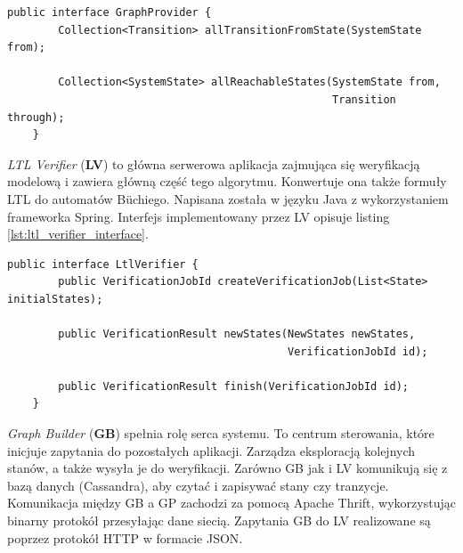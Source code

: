 \begin{lstlisting}[caption={Interfejs implementowany przez GP.},captionpos=b,label={lst:graph_provider_interface}]
    public interface GraphProvider {
        Collection<Transition> allTransitionFromState(SystemState from);

        Collection<SystemState> allReachableStates(SystemState from,
                                                   Transition through);
    }
\end{lstlisting}

\textit{LTL Verifier} (\textbf{LV}) to główna serwerowa aplikacja zajmująca się weryfikacją modelową i zawiera główną część tego algorytmu.
Konwertuje ona także formuły LTL do automatów Büchiego.
Napisana została w języku Java z wykorzystaniem frameworka Spring.
Interfejs implementowany przez LV opisuje listing \ref{lst:ltl_verifier_interface}.

\begin{lstlisting}[caption={Interfejs implementowany przez LV.},captionpos=b,label={lst:ltl_verifier_interface}]
    public interface LtlVerifier {
        public VerificationJobId createVerificationJob(List<State> initialStates);

        public VerificationResult newStates(NewStates newStates,
                                            VerificationJobId id);

        public VerificationResult finish(VerificationJobId id);
    }
\end{lstlisting}

\textit{Graph Builder} (\textbf{GB}) spełnia rolę serca systemu.
To centrum sterowania, które inicjuje zapytania do pozostałych aplikacji.
Zarządza eksploracją kolejnych stanów, a także wysyła je do weryfikacji.
Zarówno GB jak i LV komunikują się z bazą danych (Cassandra), aby czytać i zapisywać stany czy tranzycje.
Komunikacja między GB a GP zachodzi za pomocą Apache Thrift, wykorzystując binarny protokół przesyłając dane siecią.
Zapytania GB do LV realizowane są poprzez protokół HTTP w formacie JSON.

